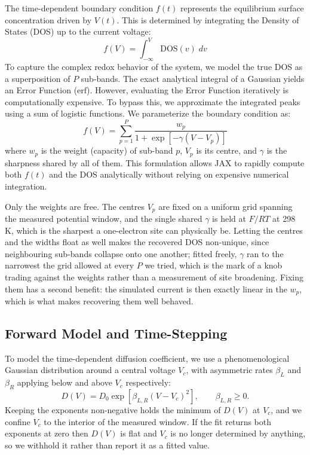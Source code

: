 \documentclass{article}
\begin{document}
The time-dependent boundary condition $f(t)$ represents the equilibrium surface concentration driven by $V(t)$. This is determined by integrating the Density of States (DOS) up to the current voltage:
\begin{equation}
    f(V) = \int_{-\infty}^{V} \text{DOS}(v)\; dv
\end{equation}
To capture the complex redox behavior of the system, we model the true DOS as a superposition of $P$ sub-bands. The exact analytical integral of a Gaussian yields an Error Function ($\text{erf}$). However, evaluating the Error Function iteratively is computationally expensive. To bypass this, we approximate the integrated peaks using a sum of logistic functions. We parameterize the boundary condition as:
\begin{equation}
    f(V) = \sum_{p=1}^P \frac{w_p}{1 + \exp\left[-\gamma(V - V_p)\right]}
\end{equation}
where $w_p$ is the weight (capacity) of sub-band $p$, $V_p$ is its centre, and $\gamma$ is the sharpness shared by all of them. This formulation allows JAX to rapidly compute both $f(t)$ and the DOS analytically without relying on expensive numerical integration.

Only the weights are free. The centres $V_p$ are fixed on a uniform grid spanning the measured potential window, and the single shared $\gamma$ is held at $F/RT$ at 298 K, which is the sharpest a one-electron site can physically be. Letting the centres and the widths float as well makes the recovered DOS non-unique, since neighbouring sub-bands collapse onto one another; fitted freely, $\gamma$ ran to the narrowest the grid allowed at every $P$ we tried, which is the mark of a knob trading against the weights rather than a measurement of site broadening. Fixing them has a second benefit: the simulated current is then exactly linear in the $w_p$, which is what makes recovering them well behaved.

\subsection{Forward Model and Time-Stepping}

To model the time-dependent diffusion coefficient, we use a phenomenological Gaussian distribution around a central voltage $V_c$, with asymmetric rates $\beta_L$ and $\beta_R$ applying below and above $V_c$ respectively:
\begin{equation}
    D(V) = D_0 \exp\left[\beta_{L,R} (V - V_c)^2\right], \qquad \beta_{L,R} \geq 0.
\end{equation}
Keeping the exponents non-negative holds the minimum of $D(V)$ at $V_c$, and we confine $V_c$ to the interior of the measured window. If the fit returns both exponents at zero then $D(V)$ is flat and $V_c$ is no longer determined by anything, so we withhold it rather than report it as a fitted value.
\end{document}
